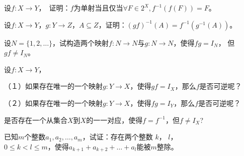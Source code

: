   \begin{Exercise}
    设$f:X\to Y$，　证明：$f$为单射当且仅当$\forall F \in 2^X, f^{-1}(f(F)) = F$。    
  \end{Exercise}
    \begin{Exercise}
    设$f:X \to Y$，$g:Y \to Z$，$A \subseteq Z$，证明：$(gf)^{-1}(A) = f^{-1}(g^{-1}(A))$。
  \end{Exercise}
  \begin{Exercise}
    设$N=\{1,2,\ldots\}$，试构造两个映射$f:N \to N$与$g:N\to N$，使得$fg = I_N$，
    但$gf \neq I_N$。
  \end{Exercise}
 \begin{Exercise}
    设$f:X \to Y$，

    （１）如果存在唯一的一个映射$g:Y\to X$，使得$gf = I_X$，那么$f$是否可逆呢？

    （２）如果存在唯一的一个映射$g:Y\to X$，使得$fg = I_Y$，那么$f$是否可逆呢？

  \end{Exercise}
  \begin{Exercise}
    是否存在一个从集合$X$到$X$的一一对应，使得$f=f^{-1}$，但$f \neq I_X$?
  \end{Exercise}

  \begin{Exercise}
    已知$m$个整数$a_1,a_2,\ldots,a_m$，试证：存在两个整数 $k$， $l$， \\ $0\leq k < l \leq m$，使得$a_{k+1}+a_{k+2}+\ldots+a_{l}$能被$m$整除。
  \end{Exercise}


\chapter{}

